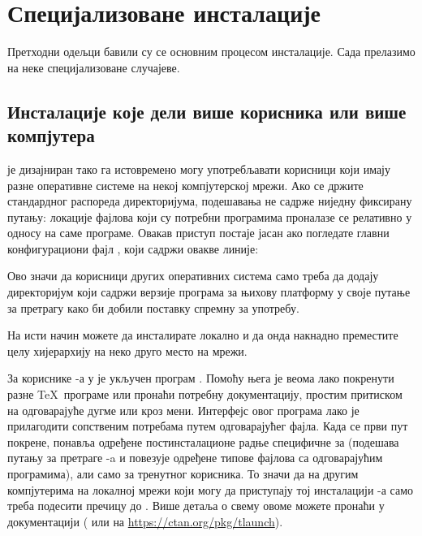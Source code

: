 \documentclass{article}
\begin{document}
\section{Специјализоване инсталације}

Претходни одељци бавили су се основним процесом инсталације. Сада
прелазимо на неке специјализоване случајеве.


\subsection{Инсталације које дели више корисника или више компјутера}
\label{sec:sharedinstall}

\TL{} је дизајниран тако га истовремено могу употребљавати корисници
који имају разне оперативне системе на некој компјутерској мрежи.
Ако се држите стандардног распореда директоријума, подешавања не
садрже ниједну фиксирану путању: локације фајлова који су потребни
\TL{} програмима проналазе се релативно у односу на саме програме.
Овакав приступ постаје јасан ако погледате главни конфигурациони фајл
, који садржи овакве линије:
Ово значи да корисници других оперативних система само треба да додају
директоријум који садржи верзије програма за њихову платформу у своје
путање за претрагу како би добили поставку спремну за употребу.

На исти начин можете да инсталирате \TL{} локално и да онда накнадно
преместите целу хијерархију на неко друго место на мрежи.

За кориснике \Windows{}-а у \TL{} је укључен програм .
Помоћу њега је веома лако покренути разне \TeX\ програме или пронаћи
потребну документацију, простим притиском на одговарајуће дугме или
кроз мени. Интерфејс овог програма лако је прилагодити сопственим
потребама путем одговарајућег  фајла. Када се први пут
покрене,  понавља одређене постинсталационе радње
специфичне за \Windows{} (подешава путању за претраге \TL{}-a и
повезује одређене типове фајлова са одговарајућим програмима), али
само за тренутног корисника. То значи да на другим компјутерима на
локалној мрежи који могу да приступају тој инсталацији \TL{}-а само
треба подесити пречицу до . Више детаља о свему
овоме можете пронаћи у документацији ( или на
\url{https://ctan.org/pkg/tlaunch}).
\end{document}
